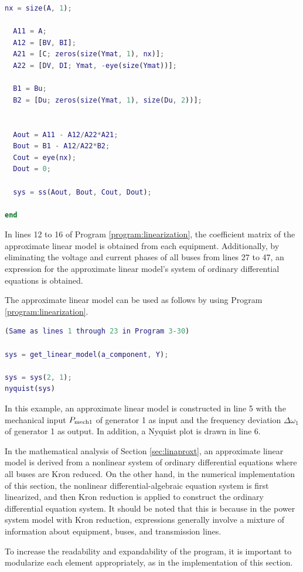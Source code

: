 \documentclass[graybox, envcountchap]{svmult}
\begin{document}
\begin{example}
\begin{lstlisting}[language=Matlab, caption=get\_linear\_model.m, label={program:linearization}]
  nx = size(A, 1);

  A11 = A;
  A12 = [BV, BI];
  A21 = [C; zeros(size(Ymat, 1), nx)];
  A22 = [DV, DI; Ymat, -eye(size(Ymat))];

  B1 = Bu;
  B2 = [Du; zeros(size(Ymat, 1), size(Du, 2))];


  Aout = A11 - A12/A22*A21;
  Bout = B1 - A12/A22*B2;
  Cout = eye(nx);
  Dout = 0;

  sys = ss(Aout, Bout, Cout, Dout);

end
\end{lstlisting}

In lines 12 to 16 of Program \ref{program:linearization}, the coefficient matrix
of the approximate linear model is obtained from each equipment. Additionally,
by eliminating the voltage and current phases of all buses from lines 27 to 47,
an expression for the approximate linear model's system of ordinary differential
equations is obtained.

The approximate linear model can be used as follows by using Program
\ref{program:linearization}.


\smallskip
\begin{lstlisting}[language=Matlab, caption=main\_linearization.m, label={program:main_linearization}]
(Same as lines 1 through 23 in Program 3-30)

sys = get_linear_model(a_component, Y);

sys = sys(2, 1);
nyquist(sys)
\end{lstlisting}

In this example, an approximate linear model is constructed in line 5 with the
mechanical input $P_{{\rm mech}1}$ of generator 1 as input and the frequency
deviation $\Delta\omega_1$ of generator 1 as output. In addition, a Nyquist plot
is drawn in line 6.
\end{example}

In the mathematical analysis of Section \ref{sec:linaproxt}, an approximate
linear model is derived from a nonlinear system of ordinary differential
equations where all buses are Kron reduced. On the other hand, in the numerical
implementation of this section, the nonlinear differential-algebraic equation
system is first linearized, and then Kron reduction is applied to construct the
ordinary differential equation system. It should be noted that this is because
in the power system model with Kron reduction, expressions generally involve a
mixture of information about equipment, buses, and transmission lines.

To increase the readability and expandability of the program, it is important to
modularize each element appropriately, as in the implementation of this section.
\end{document}
